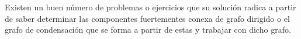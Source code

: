 Existen un buen número de problemas o ejercicios que su solución radica a partir de saber determinar las componentes fuertementes conexa de grafo dirigido o el grafo de condensación que se forma a partir de estas y trabajar con dicho grafo.